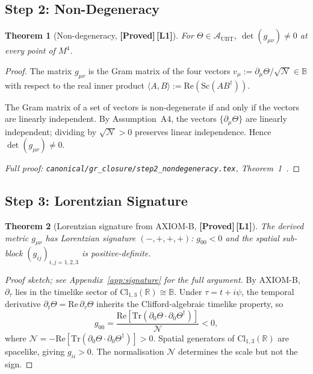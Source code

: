 \documentclass[12pt,a4paper]{article}
\newtheorem{theorem}{Theorem}[section]
\theoremstyle{definition}
\theoremstyle{remark}
\newcommand{\PROVED}{\textbf{[Proved]}}
\newcommand{\Lone}{\textbf{[L1]}}
\newcommand{\BB}{\mathbb{B}}
\newcommand{\RR}{\mathbb{R}}
\newcommand{\Tr}{\mathrm{Tr}}
\newcommand{\re}{\mathrm{Re}}
\newcommand{\calA}{\mathcal{A}}
\newcommand{\calN}{\mathcal{N}}
\begin{document}
\subsection{Step 2: Non-Degeneracy}
\label{sec:step2}

\begin{theorem}[Non-degeneracy, \PROVED\,\Lone]
\label{thm:nondeg}
For $\Theta \in \calA_{\mathrm{UBT}}$,
$\det(g_{\mu\nu}) \neq 0$ at every point of $M^4$.
\end{theorem}

\begin{proof}
The matrix $g_{\mu\nu}$ is the Gram matrix of the four vectors
$v_\mu := \partial_\mu\Theta/\sqrt{\calN} \in \BB$
with respect to the real inner product
$\langle A,B\rangle := \re(\mathrm{Sc}(AB^\dagger))$.

The Gram matrix of a set of vectors is non-degenerate if and only if the vectors
are linearly independent.
By Assumption~A4, the vectors $\{\partial_\mu\Theta\}$ are linearly independent;
dividing by $\sqrt{\calN} > 0$ preserves linear independence.
Hence $\det(g_{\mu\nu}) \neq 0$.

\medskip
\noindent\textit{Full proof:
\texttt{canonical/gr\_closure/step2\_nondegeneracy.tex},
Theorem~1~\cite{jaros2026_canonical}.}
\end{proof}

\subsection{Step 3: Lorentzian Signature}
\label{sec:step3}

\begin{theorem}[Lorentzian signature from AXIOM-B, \PROVED\,\Lone]
\label{thm:signature}
The derived metric $g_{\mu\nu}$ has Lorentzian signature $(-,+,+,+)$:
$g_{00} < 0$ and the spatial sub-block $(g_{ij})_{i,j=1,2,3}$ is
positive-definite.
\end{theorem}

\begin{proof}[Proof sketch; see Appendix~\ref{app:signature} for the full argument]
By AXIOM-B, $\partial_\tau$ lies in the timelike sector of
$\mathrm{Cl}_{1,3}(\RR) \cong \BB$.
Under $\tau = t + i\psi$, the temporal derivative
$\partial_t\Theta = \re\,\partial_\tau\Theta$
inherits the Clifford-algebraic timelike property, so
\[
  g_{00}
  = \frac{\re[\Tr(\partial_0\Theta \cdot \partial_0\Theta^\dagger)]}{\calN} < 0,
\]
where $\calN = -\re[\Tr(\partial_0\Theta \cdot \partial_0\Theta^\dagger)] > 0$.
Spatial generators of $\mathrm{Cl}_{1,3}(\RR)$ are spacelike, giving $g_{ii} > 0$.
The normalisation $\calN$ determines the scale but not the sign.
\end{proof}
\end{document}
